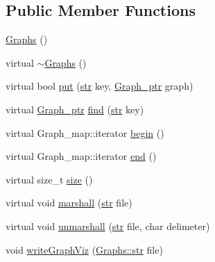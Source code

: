 \subsection*{Public Member Functions}
\begin{DoxyCompactItemize}
\item 
\hyperlink{classGraphs_ac474b1dea2e194dd74f554e75d60b83a}{Graphs} ()
\item 
virtual \hyperlink{classGraphs_ad1f81a7661844de33fc248c8575c9d3e}{$\sim$\-Graphs} ()
\item 
virtual bool \hyperlink{classGraphs_a4918b1f853cb695103da70945f8fd431}{put} (\hyperlink{classGraphs_a98a6f0415cbeae8adc7500164c78e3f3}{str} key, \hyperlink{classGraphs_a58b4b65d81870fc3b2936c068b644a4d}{Graph\-\_\-ptr} graph)
\item 
virtual \hyperlink{classGraphs_a58b4b65d81870fc3b2936c068b644a4d}{Graph\-\_\-ptr} \hyperlink{classGraphs_a91dad024134f39c0695017b419bc5e30}{find} (\hyperlink{classGraphs_a98a6f0415cbeae8adc7500164c78e3f3}{str} key)
\item 
virtual Graph\-\_\-map\-::iterator \hyperlink{classGraphs_a8a073cce4572a581991904bdf3fe08cc}{begin} ()
\item 
virtual Graph\-\_\-map\-::iterator \hyperlink{classGraphs_a0e29872711f39db4c244dd1bf970b298}{end} ()
\item 
virtual size\-\_\-t \hyperlink{classGraphs_a3b054630d2bf941bcb7f27f6b4af7830}{size} ()
\item 
virtual void \hyperlink{classGraphs_a50f10866f91655a7159aa4fe4abb66dd}{marshall} (\hyperlink{classGraphs_a98a6f0415cbeae8adc7500164c78e3f3}{str} file)
\item 
virtual void \hyperlink{classGraphs_ae16cf56023c83cd77e8b5592c9274c5f}{unmarshall} (\hyperlink{classGraphs_a98a6f0415cbeae8adc7500164c78e3f3}{str} file, char delimeter)
\item 
void \hyperlink{classGraphs_a6a93fd87235a675d39c23e8fcbafb8b1}{write\-Graph\-Viz} (\hyperlink{classGraphs_a98a6f0415cbeae8adc7500164c78e3f3}{Graphs\-::str} file)
\end{DoxyCompactItemize}



